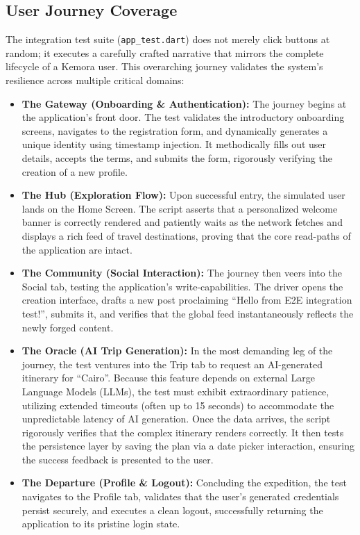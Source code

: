 \subsection{User Journey Coverage}
The integration test suite (\texttt{app\_test.dart}) does not merely click buttons at random; it executes a carefully crafted narrative that mirrors the complete lifecycle of a Kemora user. This overarching journey validates the system's resilience across multiple critical domains:
\begin{itemize}
    \item \textbf{The Gateway (Onboarding \& Authentication):} The journey begins at the application's front door. The test validates the introductory onboarding screens, navigates to the registration form, and dynamically generates a unique identity using timestamp injection. It methodically fills out user details, accepts the terms, and submits the form, rigorously verifying the creation of a new profile.
    \item \textbf{The Hub (Exploration Flow):} Upon successful entry, the simulated user lands on the Home Screen. The script asserts that a personalized welcome banner is correctly rendered and patiently waits as the network fetches and displays a rich feed of travel destinations, proving that the core read-paths of the application are intact.
    \item \textbf{The Community (Social Interaction):} The journey then veers into the Social tab, testing the application's write-capabilities. The driver opens the creation interface, drafts a new post proclaiming ``Hello from E2E integration test!'', submits it, and verifies that the global feed instantaneously reflects the newly forged content.
    \item \textbf{The Oracle (AI Trip Generation):} In the most demanding leg of the journey, the test ventures into the Trip tab to request an AI-generated itinerary for ``Cairo''. Because this feature depends on external Large Language Models (LLMs), the test must exhibit extraordinary patience, utilizing extended timeouts (often up to 15 seconds) to accommodate the unpredictable latency of AI generation. Once the data arrives, the script rigorously verifies that the complex itinerary renders correctly. It then tests the persistence layer by saving the plan via a date picker interaction, ensuring the success feedback is presented to the user.
    \item \textbf{The Departure (Profile \& Logout):} Concluding the expedition, the test navigates to the Profile tab, validates that the user's generated credentials persist securely, and executes a clean logout, successfully returning the application to its pristine login state.
\end{itemize}


